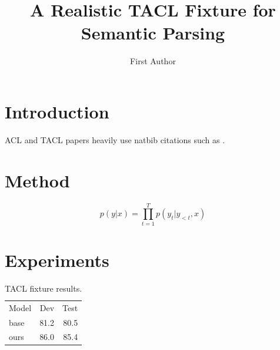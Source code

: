 \documentclass[aclang]{acl}
\begin{document}
\title{A Realistic TACL Fixture for Semantic Parsing}
\author{First Author}
\aclfinalcopy
\section{Introduction}
ACL and TACL papers heavily use natbib citations such as \citep{author2024example}.
\section{Method}
\begin{equation}
  p(y|x)=\prod_{t=1}^{T}p(y_t|y_{<t},x)
\end{equation}
\section{Experiments}
\begin{table}[ht]
\centering
\begin{tabular}{lrr}
Model & Dev & Test\\
base & 81.2 & 80.5\\
ours & 86.0 & 85.4\\
\end{tabular}
\caption{TACL fixture results.}
\end{table}


\end{document}
